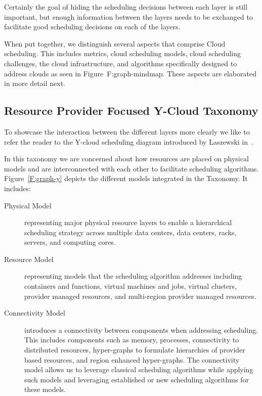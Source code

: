\documentclass[final,5p,times,twocolumn]{elsarticle}
\begin{document}
Certainly the goal of hiding the scheduling decisions between each
layer is still important, but enough information between the layers
needs to be exchanged to facilitate good scheduling decisions on each
of the layers.

When put together, we distinguish several aspects that comprise Cloud
scheduling. This includes metrics, cloud scheduling models, cloud
scheduling challenges, the cloud infrastructure, and algorithms
specifically designed to address clouds as seen in Figure~{F:graph-mindmap}.
These aspects are elaborated in more detail next.



\subsection{Resource Provider Focused Y-Cloud Taxonomy}\label{sec:y}

To showcase the interaction between the different layers more clearly
we like to refer the reader to the Y-cloud scheduling diagram
introduced by Laszewski in~\cite{lasbook}.

In this taxonomy we are concerned about how resources are placed on
physical models and are interconnected with each other to facilitate
scheduling algorithms. Figure~\ref{F:graph-y} depicts the different
models integrated in the Taxonomy. It includes:

\begin{description}

\item[Physical Model] representing major physical resource layers to
  enable a hierarchical scheduling strategy across multiple data
  centers, data centers, racks, servers, and computing cores.

\item[Resource Model] representing models that the scheduling
  algorithm addresses including containers and functions, virtual
  machines and jobs, virtual clusters, provider managed resources, and
  multi-region provider managed resources.

\item[Connectivity Model] introduces a connectivity between components
  when addressing scheduling. This includes components such as memory,
  processes, connectivity to distributed resources, hyper-graphs to
  formulate hierarchies of provider based resources, and region
  enhanced hyper-graphs. The connectivity model allows us to leverage
  classical scheduling algorithms while applying such models and
  leveraging established or new scheduling algorithms for these
  models.

\end{description}
\end{document}
